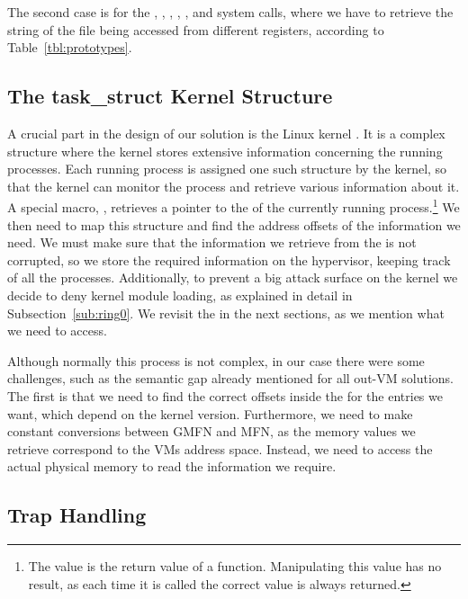 \par The second case is for the , , , , , and  system calls, where we have to retrieve the string of the file being accessed from different registers, according to Table~\ref{tbl:prototypes}. 




\subsection{The task\_struct Kernel Structure}\label{sub:struct}
\par A crucial part in the design of our solution is the Linux kernel . It is a complex structure where the kernel stores extensive information concerning the running processes. Each running process is assigned one such structure by the kernel, so that the kernel can monitor the process and retrieve various information about it. A special macro, , retrieves a pointer to the  of the currently running process.\footnote{The value is the return value of a function. Manipulating this value has no result, as each time it is called the correct value is always returned.} We then need to map this structure and find the address offsets of the information we need. We must make sure that the information we retrieve from the  is not corrupted, so we store the required information on the hypervisor, keeping track of all the processes. Additionally, to prevent a big attack surface on the kernel we decide to deny kernel module loading, as explained in detail in Subsection~\ref{sub:ring0}. We revisit the  in the next sections, as we mention what we need to access.

\par Although normally this process is not complex, in our case there were some challenges, such as the semantic gap already mentioned for all out-\ac{VM} solutions. The first is that we need to find the correct offsets inside the  for the entries we want, which depend on the kernel version. Furthermore, we need to make constant conversions between \ac{GMFN} and \ac{MFN}, as the memory values we retrieve correspond to the \ac{VM}s address space. Instead, we need to access the actual physical memory to read the information we require.


\subsection{Trap Handling}\label{sub:handling}


